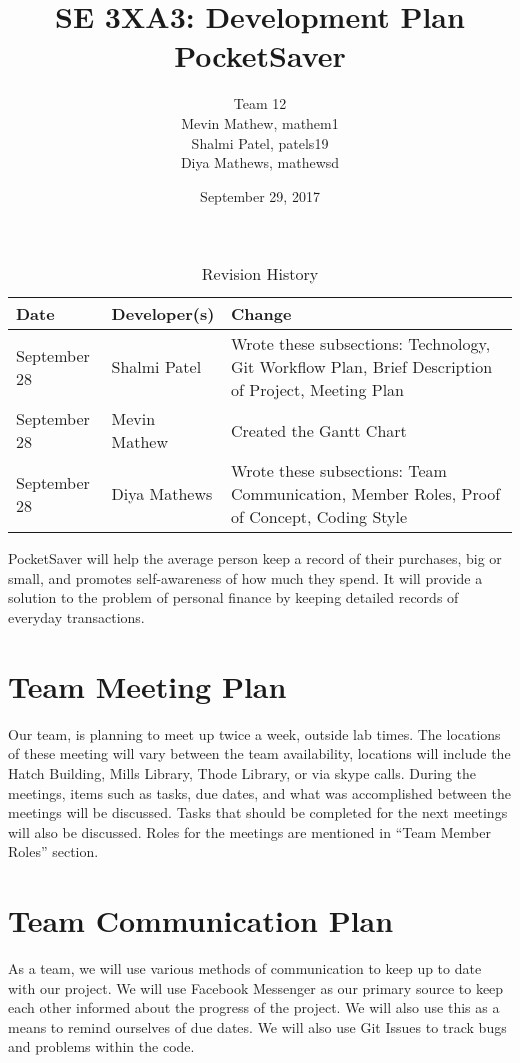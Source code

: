 \documentclass{article}
\title{SE 3XA3: Development Plan\\PocketSaver}
\author{Team 12
		\\ Mevin Mathew, mathem1
		\\ Shalmi Patel, patels19
		\\ Diya Mathews, mathewsd
}
\date{September 29, 2017}
\begin{document}
\begin{table}[hp]
\caption{Revision History} \label{TblRevisionHistory}
\begin{tabularx}{\textwidth}{llX}
\toprule
\textbf{Date} & \textbf{Developer(s)} & \textbf{Change}\\
\midrule
September 28 & Shalmi Patel & Wrote these subsections: Technology, Git Workflow Plan, Brief Description of Project, Meeting Plan\\
September 28 & Mevin Mathew & Created the Gantt Chart\\
September 28 & Diya Mathews & Wrote these subsections: Team Communication, Member Roles, Proof of Concept, Coding Style\\
\bottomrule
\end{tabularx}
\end{table}

\newpage

\maketitle

PocketSaver will help the average person keep a record of their purchases, big or small, and promotes self-awareness of how much they spend. It will provide a solution to the problem of personal finance by keeping detailed records of everyday transactions.

\section{Team Meeting Plan}
Our team, is planning to meet up twice a week, outside lab times. The locations of these meeting will vary between the team availability, locations will include the Hatch Building, Mills Library, Thode Library, or via skype calls. During the meetings, items such as tasks, due dates, and what was accomplished between the meetings will be discussed. Tasks that should be completed for the next meetings will also be discussed. Roles for the meetings are mentioned in “Team Member Roles” section.

\section{Team Communication Plan}
As a team, we will use various methods of communication to keep up to date with our project. We will use Facebook Messenger as our primary source to keep each other informed about the progress of the project. We will also use this as a means to remind ourselves of due dates. We will also use Git Issues to track bugs and problems within the code.
\end{document}
